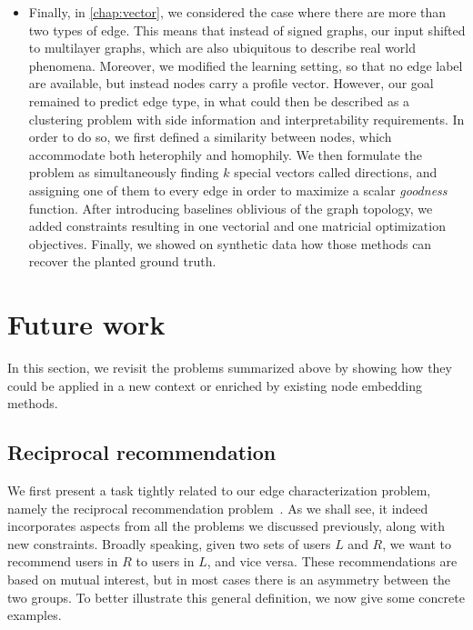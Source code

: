 \begin{itemize}
  \item Finally, in \autoref{chap:vector}, we considered the case where there are more than two types
    of edge. This means that instead of signed graphs, our input shifted to multilayer graphs, which
    are also ubiquitous to describe real world phenomena. Moreover, we modified the learning
    setting, so that no edge label are available, but instead nodes carry a profile vector. However,
    our goal remained to predict edge type, in what could then be described as a clustering problem
    with side information and interpretability requirements. In order to do so, we first defined a
    similarity between nodes, which accommodate both heterophily and homophily. We then formulate
    the problem as simultaneously finding $k$ special vectors called directions, and assigning one
    of them to every edge in order to maximize a scalar \emph{goodness} function. After introducing
    baselines oblivious of the graph topology, we added constraints resulting in one vectorial and
    one matricial optimization objectives. Finally, we showed on synthetic data how those methods
    can recover the planted ground truth.

\end{itemize}

\section{Future work}

In this section, we revisit the problems summarized above by showing how they could be applied in a
new context or enriched by existing node embedding methods.

\subsection{Reciprocal recommendation}

We first present a task tightly related to our edge characterization problem, namely the reciprocal
recommendation problem~\autocite{Pizzato2013}. As we shall see, it indeed incorporates aspects from
all the problems we discussed previously, along with new constraints. Broadly speaking,
given two sets of users $L$ and $R$, we want to recommend users in $R$ to users in $L$, and vice
versa. These recommendations are based on mutual interest, but in most cases there is an asymmetry
between the two groups. To better illustrate this general definition, we now give some concrete
examples.

